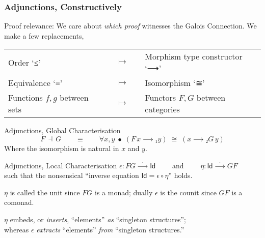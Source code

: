 \documentclass[serif,mathserif,10pt]{beamer}
\def\Id{\mathsf{Id}}
\begin{document}
\begin{frame} \frametitle{Adjunctions, Constructively}

  \alert{Proof relevance:} We care about \emph{which proof} witnesses the Galois Connection. \pause
  We make a few replacements, \pause
  \begin{tabular}{lcl}
    Order `≤'    &   $\quad↦\quad$ & Morphism type constructor `⟶' \\ \pause
    Equivalence `≡' & $\quad↦\quad$ & Isomorphism `≅' \\ \pause
    Functions $f,g$ between sets   & $\quad↦\quad$ & Functors $F,G$ between categories \pause
  \end{tabular}
  
  \begin{block}{Adjunctions, Global Characterisation}
    \[ F \,⊣\, G \qquad≡\qquad
    ∀x,y \;\bullet\; (F\, x ⟶₁ y) \;≅\; (x ⟶₂ G\, y)\]
    Where the isomorphism is natural in $x$ and $y$.
  \end{block} \pause
  
  \begin{block}{Adjunctions, Local Characterisation}
    \centering $\epsilon : FG \overset{.}{⟶} \Id
    \qquad \text{ and } \qquad \eta : \Id \overset{.}{⟶} GF$
    \\ such that the nonsensical “inverse equation $\Id = \epsilon ∘ \eta$” holds.

      {\footnotesize
        $\eta$ is called the \alert{unit} since $FG$ is a monad;
        dually $\epsilon$ is the \alert{counit} since $GF$ is a comonad. }
  \end{block} \pause
  
  $\eta$ embeds, or \emph{inserts}, “elements” \emph{as} “singleton structures”; \\
  whereas $\epsilon$ \emph{extracts} “elements” \emph{from} “singleton structures.”
  
\end{frame}
\end{document}
